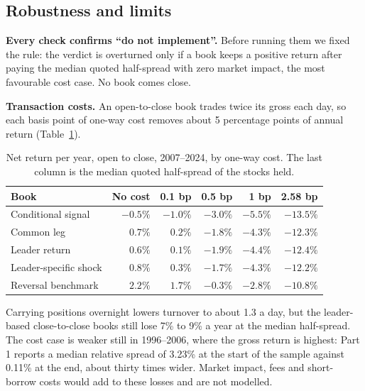 \documentclass[11pt,letterpaper]{article}
\begin{document}
\subsection{Robustness and limits}

\textbf{Every check confirms ``do not implement''.} Before running them
we fixed the rule: the verdict is overturned only if a book keeps a positive
return after paying the median quoted half-spread with zero market impact, the
most favourable cost case. No book comes close.

\textbf{Transaction costs.} An open-to-close book trades twice its gross each
day, so each basis point of one-way cost removes about 5 percentage points of
annual return (Table~\ref{tab:costs}).

\begin{table}[h]
\centering\small
\caption{Net return per year, open to close, 2007--2024, by one-way cost. The last column is the median quoted half-spread of the stocks held.}\label{tab:costs}
\begin{tabular}{@{}lrrrrr@{}}
\toprule
Book & No cost & 0.1 bp & 0.5 bp & 1 bp & 2.58 bp \\
\midrule
Conditional signal    & $-0.5\%$ & $-1.0\%$ & $-3.0\%$ & $-5.5\%$ & $-13.5\%$ \\
Common leg            & $0.7\%$  & $0.2\%$  & $-1.8\%$ & $-4.3\%$ & $-12.3\%$ \\
Leader return         & $0.6\%$  & $0.1\%$  & $-1.9\%$ & $-4.4\%$ & $-12.4\%$ \\
Leader-specific shock & $0.8\%$  & $0.3\%$  & $-1.7\%$ & $-4.3\%$ & $-12.2\%$ \\
Reversal benchmark    & $2.2\%$  & $1.7\%$  & $-0.3\%$ & $-2.8\%$ & $-10.8\%$ \\
\bottomrule
\end{tabular}
\end{table}

Carrying positions overnight lowers turnover to about 1.3 a day, but the
leader-based close-to-close books still lose 7\% to 9\% a year at the median
half-spread. The cost case is weaker still in 1996--2006, where the gross
return is highest: Part 1 reports a median relative spread of 3.23\% at the
start of the sample against 0.11\% at the end, about thirty times wider.
Market impact, fees and short-borrow costs would add to these losses and are
not modelled.
\end{document}
